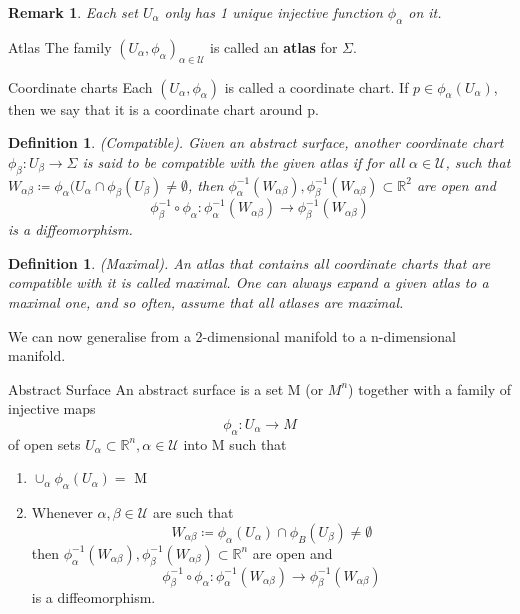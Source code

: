 \documentclass[twoside]{article}
\newtheorem{definition}[theorem]{Definition}
\newtheorem{remark}[theorem]{Remark}
\begin{document}
\begin{remark}Each set $U_{\alpha}$ only has 1 unique injective function $\phi_{\alpha}$ on it.
\end{remark}

\begin{definition_exam}{Atlas}{} The family $(U_{\alpha},\phi_{\alpha})_{\alpha \in \mathcal{U}}$ is called an \textbf{atlas} for $\Sigma$.
\end{definition_exam}

\begin{definition_exam}{Coordinate charts}{} Each $(U_{\alpha}, \phi_{\alpha})$ is called a coordinate chart. If $p \in \phi_{\alpha}(U_{\alpha})$, then we say that it is a coordinate chart around p.
\end{definition_exam}

\begin{definition}(Compatible). Given an abstract surface, another coordinate chart $\phi_{\beta}: U_{\beta} \rightarrow \Sigma$ is said to be compatible with the given atlas if for all $\alpha \in \mathcal{U}$, such that $W_{\alpha \beta} \coloneqq \phi_{\alpha}(U_{\alpha} \cap \phi_{\beta}(U_{\beta}) \neq \emptyset$, then $\phi_{\alpha}^{-1}(W_{\alpha \beta}), \phi_{\beta}^{-1}(W_{\alpha \beta}) \subset \mathbb{R}^2$ are open and 
$$
\phi_{\beta}^{-1}\circ \phi_{\alpha}: \phi_{\alpha}^{-1}(W_{\alpha \beta}) \rightarrow \phi_{\beta}^{-1}(W_{\alpha \beta})
$$
is a diffeomorphism.
\end{definition}

\begin{definition}(Maximal). An atlas that contains all coordinate charts that are compatible with it is called maximal. One can always expand a given atlas to a maximal one, and so often, assume that all atlases are maximal.
\end{definition}

We can now generalise from a 2-dimensional manifold to a n-dimensional manifold.
\begin{definition_exam}{Abstract Surface}{} An abstract surface is a set M (or $M^n$) together with a family of injective maps 
$$
\phi_{\alpha}: U_{\alpha} \rightarrow M
$$
of open sets $U_{\alpha} \subset \mathbb{R}^n, \alpha \in \mathcal{U}$ into M such that 
\begin{enumerate}
\item $\cup_{\alpha}\phi_{\alpha}(U_{\alpha}) =$ M
\item Whenever $\alpha,\beta \in \mathcal{U}$ are such that 
$$
W_{\alpha \beta} \coloneqq \phi_{\alpha}(U_{\alpha}) \cap \phi_{B}(U_{\beta}) \neq \emptyset
$$
then $\phi_{\alpha}^{-1}(W_{\alpha \beta}), \phi_{\beta}^{-1}(W_{\alpha \beta}) \subset \mathbb{R}^n$ are open and 
$$
\phi_{\beta}^{-1}\circ \phi_{\alpha}: \phi_{\alpha}^{-1}(W_{\alpha\beta}) \rightarrow \phi_{\beta}^{-1}(W_{\alpha \beta})
$$
is a diffeomorphism.
\end{enumerate}
\end{definition_exam}
\end{document}
